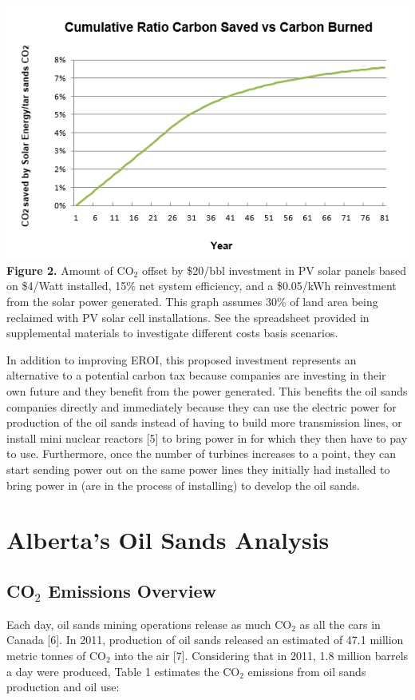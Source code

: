 \documentclass[12pt]{article}
\begin{document}
\begin{center}
\includegraphics{g2.png}
{\bf Figure 2.} Amount of CO$_2$ offset by \$20/bbl investment in PV solar panels based on \$4/Watt installed, 15\% net system efficiency, and a \$0.05/kWh reinvestment from the solar power generated. This graph assumes 30\% of land area being reclaimed with PV solar cell installations. See the spreadsheet provided in supplemental materials to investigate different costs basis scenarios.
\end{center}

In addition to improving EROI, this proposed investment represents an alternative to a potential carbon tax because companies are investing in their own future and they benefit from the power generated.  This benefits the oil sands companies directly and immediately because they can use the electric power for production of the oil sands instead of having to build more transmission lines, or install mini nuclear reactors [5] to bring power in for which they then have to pay to use. Furthermore, once the number of turbines increases to a point, they can start sending power out on the same power lines they initially had installed to bring power in (are in the process of installing) to develop the oil sands.

\section{Alberta's Oil Sands Analysis}

\subsection{CO$_2$ Emissions Overview}

Each day, oil sands mining operations release as much CO$_2$ as all the cars in Canada [6]. In 2011, production of oil sands released an estimated of 47.1 million metric tonnes of CO$_2$ into the air [7]. Considering that in 2011, 1.8 million barrels a day were produced, Table 1 estimates the CO$_2$ emissions from oil sands production and oil use: \\
\end{document}
